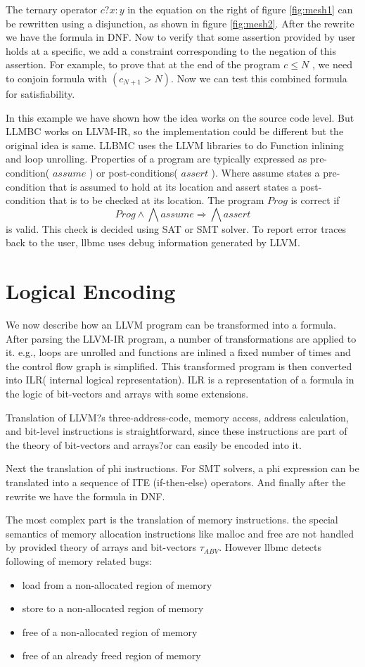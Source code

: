 \documentclass[14pt]{article}
\begin{document}
The ternary operator \(c?x:y\) in the equation on the right of figure \ref{fig:mesh1} can be rewritten using a disjunction, as shown in figure \ref{fig:mesh2}. After the rewrite we have the formula in DNF. Now to verify that some assertion provided by user holds at a specific, we add a constraint corresponding to the negation of this assertion. For example, to prove that at the end of the program \(c \leq N\) , we need to conjoin formula with \((c_{N+1}>N)\). Now we can test this combined formula for satisfiability. 

In this example we have shown how the idea works on the source code level. But LLMBC works on LLVM-IR, so the implementation could be different but the original idea is same. LLBMC uses the LLVM libraries to do Function inlining and loop unrolling. Properties of a program are typically expressed  as pre-condition( \(assume\) ) or post-conditions( \(assert\) ). Where assume states a pre-condition that is assumed to hold at its location and assert states a post-condition that is to be checked at its location. The program  \(Prog\)  is correct if
\[Prog \wedge \bigwedge assume \Rightarrow  \bigwedge assert\]
is valid. This check is decided using SAT or SMT solver. To report error traces back to the user, llbmc uses debug information generated by LLVM.


\section{Logical Encoding}\label{Logical Encoding}
We now describe how an LLVM program can be transformed into a formula. After parsing the LLVM-IR program, a number of transformations are applied to it.  e.g., loops are unrolled and functions are inlined a fixed number of times and the control flow graph is simplified. This transformed program is then converted into ILR( internal logical representation). ILR is a representation of a formula in the logic of bit-vectors and arrays with some extensions. 

Translation of LLVM?s three-address-code, memory access, address calculation, and bit-level instructions is straightforward, since these instructions are part of the theory of bit-vectors and arrays?or can easily be encoded into it.

Next the translation of phi instructions. For SMT solvers, a phi expression can be translated into a sequence of ITE (if-then-else) operators. And finally after the rewrite we have the formula in DNF.

The most complex part is the translation of memory instructions. the special semantics of memory allocation instructions like malloc and free are not handled by provided theory of arrays and bit-vectors \(\tau_{ABV}\). However llbmc detects following  of memory related bugs:
\begin{itemize}
  \item  load from a non-allocated region of memory
  \item store to a non-allocated region of memory
  \item free of a non-allocated region of memory
  \item free of an already freed region of memory
\end{itemize}
\end{document}
